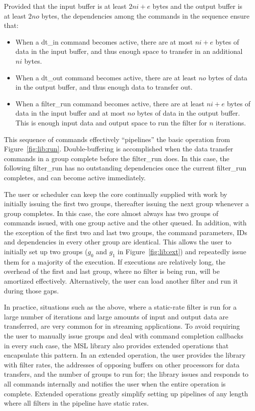 Provided that the input buffer is at least $2ni+e$ bytes and the output buffer is at least $2no$ bytes, the dependencies among the commands in the sequence ensure that:
\begin{itemize}
\item When a \textsf{dt\_in} command becomes active, there are at most $ni+e$ bytes of data in the input buffer, and thus enough space to transfer in an additional $ni$ bytes.
\item When a \textsf{dt\_out} command becomes active, there are at least $no$ bytes of data in the output buffer, and thus enough data to transfer out.
\item When a \textsf{filter\_run} command becomes active, there are at least $ni+e$ bytes of data in the input buffer and at most $no$ bytes of data in the output buffer. This is enough input data and output space to run the filter for $n$ iterations.
\end{itemize}

This sequence of commands effectively ``pipelines'' the basic operation from Figure~\ref{fig:lib:run}. Double-buffering is accomplished when the data transfer commands in a group complete before the \textsf{filter\_run} does. In this case, the following \textsf{filter\_run} has no outstanding dependencies once the current \textsf{filter\_run} completes, and can become active immediately.

The user or scheduler can keep the core continually supplied with work
by initially issuing the first two groups, thereafter issuing the next
group whenever a group completes. In this case, the core almost always
has two groups of commands issued, with one group active and the other
queued. In addition, with the exception of the first two and last two
groups, the command parameters, IDs and dependencies in every other
group are identical. This allows the user to initially set up two
groups ($g_0$ and $g_1$ in Figure~\ref{fig:lib:ext}) and repeatedly
issue them for a majority of the execution. If executions are
relatively long, the overhead of the first and last group, where no
filter is being run, will be amortized effectively. Alternatively, the
user can load another filter and run it during those gaps.

In practice, situations such as the above, where a static-rate filter
is run for a large number of iterations and large amounts of input and
output data are transferred, are very common for in streaming applications. To
avoid requiring the user to manually issue groups and deal with
command completion callbacks in every such case, the MSL library also
provides extended operations that encapsulate this pattern. In an
extended operation, the user provides the library with filter rates,
the addresses of opposing buffers on other processors for data
transfers, and the number of groups to run for; the library issues and
responds to all commands internally and notifies the user when the
entire operation is complete.
Extended operations greatly simplify setting up pipelines
of any length where all filters in the pipeline have static rates.

